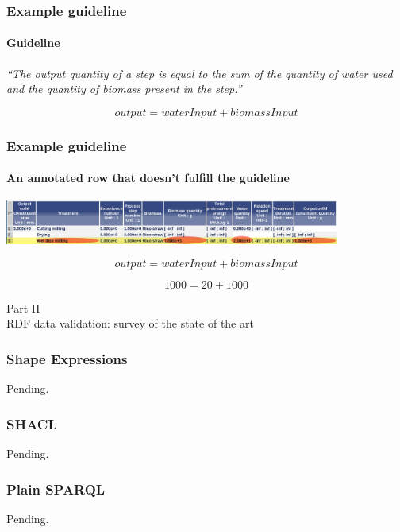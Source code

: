 \documentclass{beamer}
\newcommand{\partslide}[2]{
  \begin{center}
    \LARGE{#1} \\
    \vspace{0.5cm}
    \huge{#2}
  \end{center}
}
\begin{document}
\begin{frame}
  \frametitle{Example guideline}
  \framesubtitle{Guideline}

  \textit{``The output quantity of a step is equal to the sum of the quantity
  of water used and the quantity of biomass present in the step.''}

  \pause

  $$output = waterInput + biomassInput$$
\end{frame}

\begin{frame}
  \frametitle{Example guideline}
  \framesubtitle{An annotated row that doesn't fulfill the guideline}

  \begin{center}
    \includegraphics[width=11cm]{atweb-screenshot-row-with-relation.jpg}
  \end{center}

  \pause

  $$output = waterInput + biomassInput$$

  \pause

  {
    \color{red}
    $$1000 = 20 + 1000$$
  }
\end{frame}


\begin{frame}
  \partslide{Part II}{RDF data validation: survey of the state of the art}
\end{frame}

\begin{frame}
  \frametitle{Shape Expressions}

  Pending.
\end{frame}

\begin{frame}
  \frametitle{SHACL}

  Pending.
\end{frame}

\begin{frame}
  \frametitle{Plain SPARQL}

  Pending.
\end{frame}
\end{document}
